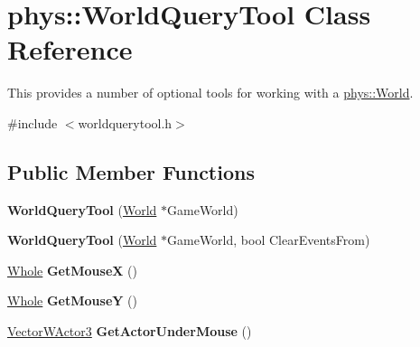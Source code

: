\hypertarget{classphys_1_1WorldQueryTool}{
\section{phys::WorldQueryTool Class Reference}
\label{d8/d69/classphys_1_1WorldQueryTool}
}


This provides a number of optional tools for working with a \hyperlink{classphys_1_1World}{phys::World}.  




{\ttfamily \#include $<$worldquerytool.h$>$}

\subsection*{Public Member Functions}
\begin{DoxyCompactItemize}
\item 
\hypertarget{classphys_1_1WorldQueryTool_a4b0a982fe71e5ee498c2023e2806a363}{
{\bfseries WorldQueryTool} (\hyperlink{classphys_1_1World}{World} $\ast$GameWorld)}
\label{d8/d69/classphys_1_1WorldQueryTool_a4b0a982fe71e5ee498c2023e2806a363}

\item 
\hypertarget{classphys_1_1WorldQueryTool_a96a7f0d575ec046bf159d7685e3e7482}{
{\bfseries WorldQueryTool} (\hyperlink{classphys_1_1World}{World} $\ast$GameWorld, bool ClearEventsFrom)}
\label{d8/d69/classphys_1_1WorldQueryTool_a96a7f0d575ec046bf159d7685e3e7482}

\item 
\hypertarget{classphys_1_1WorldQueryTool_a55721f152fb117fdfb8bc6d20af6b1dc}{
\hyperlink{namespacephys_a460f6bc24c8dd347b05e0366ae34f34a}{Whole} {\bfseries GetMouseX} ()}
\label{d8/d69/classphys_1_1WorldQueryTool_a55721f152fb117fdfb8bc6d20af6b1dc}

\item 
\hypertarget{classphys_1_1WorldQueryTool_ac2d8517db7305157c1393320f434751b}{
\hyperlink{namespacephys_a460f6bc24c8dd347b05e0366ae34f34a}{Whole} {\bfseries GetMouseY} ()}
\label{d8/d69/classphys_1_1WorldQueryTool_ac2d8517db7305157c1393320f434751b}

\item 
\hypertarget{classphys_1_1WorldQueryTool_a85c3bcafc9ceea4ed485ff457d7b1f7b}{
\hyperlink{classphys_1_1VectorWActor3}{VectorWActor3} {\bfseries GetActorUnderMouse} ()}
\label{d8/d69/classphys_1_1WorldQueryTool_a85c3bcafc9ceea4ed485ff457d7b1f7b}

\end{DoxyCompactItemize}


